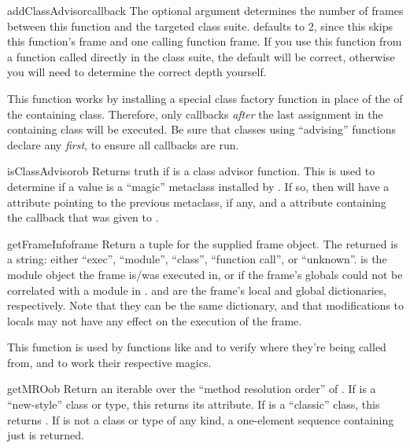 \begin{verbatim%
}
\begin{verbatim%
}
\begin{verbatim%
}
\begin{verbatim%
}
\begin{verbatim%
}
\begin{verbatim%
}
\begin{funcdesc}{addClassAdvisor}{callback }
The optional  argument determines the number of frames between this
function and the targeted class suite.   defaults to 2, since this
skips this function's frame and one calling function frame.  If you use this
function from a function called directly in the class suite, the default will
be correct, otherwise you will need to determine the correct depth yourself.

This function works by installing a special class factory function in
place of the  of the containing class.  Therefore, only
callbacks \emph{after} the last  assignment in the
containing class will be executed.  Be sure that classes using ``advising''
functions declare any  \emph{first}, to ensure all
callbacks are run.
\end{funcdesc}

\begin{funcdesc}{isClassAdvisor}{ob}
Returns truth if  is a class advisor function.  This is used to
determine if a  value is a ``magic'' metaclass installed
by .  If so, then  will have a
 attribute pointing to the previous metaclass,
if any, and a  attribute containing the callback that was
given to .
\end{funcdesc}

\begin{funcdesc}{getFrameInfo}{frame}
Return a  tuple for
the supplied frame object.  The returned  is a string: either
``exec'', ``module'', ``class'', ``function call'', or ``unknown''.
 is the module object the frame is/was executed in, or
 if the frame's globals could not be correlated with a module in
.   and  are the frame's local
and global dictionaries, respectively.  Note that they can be the same
dictionary, and that modifications to locals may not have any effect on the
execution of the frame.

This function is used by functions like  and
 to verify where they're being called from, and to work
their respective magics.
\end{funcdesc}


\begin{funcdesc}{getMRO}{ob }
Return an iterable over the ``method resolution order'' of .  If
 is a ``new-style'' class or type, this returns its 
attribute.  If  is a ``classic'' class, this returns
.  If  is not a class
or type of any kind, a one-element sequence containing just  is
returned.
\end{funcdesc}



\end{verbatim%
}
\end{verbatim%
}
\end{verbatim%
}
\end{verbatim%
}
\end{verbatim%
}
\end{verbatim%
}
